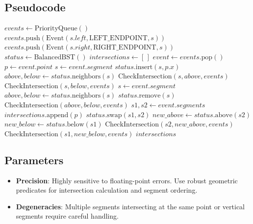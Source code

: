

\subsection{Pseudocode}

\begin{algorithm}[htbp]
\caption{Bentley-Ottmann Segment Intersection}
\label{alg:bentley_ottmann}
\begin{algorithmic}[1]
  \State $events \gets \text{PriorityQueue}()$
    \State $events.\text{push}(\text{Event}(s.left, \text{LEFT\_ENDPOINT}, s))$
    \State $events.\text{push}(\text{Event}(s.right, \text{RIGHT\_ENDPOINT}, s))$
  \EndFor
  \State $status \gets \text{BalancedBST}()$
  \State $intersections \gets [\,]$
    \State $event \gets events.\text{pop}()$
    \State $p \gets event.point$
      \State $s \gets event.segment$
      \State $status.\text{insert}(s, p.x)$
      \State $above, below \gets status.\text{neighbors}(s)$
      \State $\text{CheckIntersection}(s, above, events)$
      \State $\text{CheckIntersection}(s, below, events)$
      \State $s \gets event.segment$
      \State $above, below \gets status.\text{neighbors}(s)$
      \State $status.\text{remove}(s)$
      \State $\text{CheckIntersection}(above, below, events)$
      \State $s1, s2 \gets event.segments$
      \State $intersections.\text{append}(p)$
      \State $status.\text{swap}(s1, s2)$
      \State $new\_above \gets status.\text{above}(s2)$
      \State $new\_below \gets status.\text{below}(s1)$
      \State $\text{CheckIntersection}(s2, new\_above, events)$
      \State $\text{CheckIntersection}(s1, new\_below, events)$
    \EndIf
  \EndWhile
  \State \Return $intersections$
\EndFunction
\end{algorithmic}
\end{algorithm}

\subsection{Parameters}

\begin{itemize}
\item \textbf{Precision}: Highly sensitive to floating-point errors. Use robust geometric predicates for intersection calculation and segment ordering.
\item \textbf{Degeneracies}: Multiple segments intersecting at the same point or vertical segments require careful handling.
\end{itemize}

